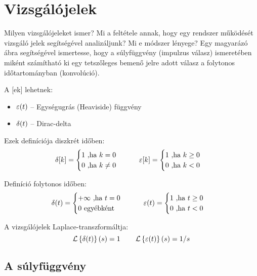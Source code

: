 \documentclass[../main.tex]{subfiles}
\begin{document}
\section{Vizsgálójelek}

\begin{fulltheorem}
	Milyen vizsgálójeleket ismer? Mi a feltétele annak, hogy egy rendszer
	működését vizsgáló jelek segítségével analizáljunk? Mi e módszer lényege?
	Egy magyarázó ábra segítségével ismertesse, hogy a súlyfüggvény
	(impulzus válasz) ismeretében miként számítható ki egy tetszőleges bemenő
	jelre adott válasz a folytonos időtartományban (konvolúció).
\end{fulltheorem}

A [ek] lehetnek:
\begin{itemize}
	\item $\varepsilon(t)$ -- Egységugrás (Heaviside) függvény
	\item $\delta(t)$ -- Dirac-delta
\end{itemize}

Ezek definíciója diszkrét időben:
\[
	\delta[k] = \begin{cases}
		1 \text{ ,ha } k = 0    \\
		0 \text{ ,ha } k \neq 0 \\
	\end{cases}
	\qquad
	\varepsilon[k] = \begin{cases}
		1 \text{ ,ha } k \geq 0 \\
		0 \text{ ,ha } k < 0    \\
	\end{cases}
\]

Definíció folytonos időben:
\[
	\delta(t) = \begin{cases}
		+ \infty \text{ ,ha } t = 0 \\
		0 \text{ egyébként}
	\end{cases}
	\qquad
	\varepsilon(t) = \begin{cases}
		1 \text{ ,ha } t \geq 0 \\
		0 \text{ ,ha } t < 0    \\
	\end{cases}
\]

A vizsgálójelek Laplace-transzformáltja:
\[
	\operatorname{\mathcal{L}} \left\{ \delta(t) \right\}(s) = 1
	\qquad
	\operatorname{\mathcal{L}} \left\{ \varepsilon(t) \right\} (s) = 1 / s
\]

\subsection{A súlyfüggvény}
\end{document}

